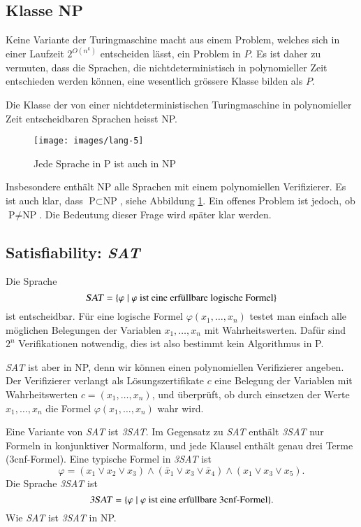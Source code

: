 \subsection{Klasse NP}
Keine Variante der Turingmaschine macht aus einem Problem,
welches sich in einer Laufzeit $2^{O(n^k)}$ entscheiden
lässt, ein Problem in $P$. Es ist daher zu vermuten,
dass die Sprachen, die nichtdeterministisch in polynomieller
Zeit entschieden werden können, eine wesentlich grössere
Klasse bilden als $P$.

\begin{definition}
Die Klasse der von einer nichtdeterministischen Turingmaschine
in polynomieller Zeit entscheidbaren Sprachen heisst NP.
\end{definition}

\begin{figure}
\begin{center}
\texttt{[image: images/lang-5]}
\end{center}
\caption{Jede Sprache in P ist auch in NP\label{psubsetnp}}
\end{figure}%

Insbesondere enthält NP alle Sprachen mit einem polynomiellen
Verifizierer. Es ist auch klar, dass $\text{P}\subset\text{NP}$,
siehe Abbildung \ref{psubsetnp}.
Ein offenes Problem ist jedoch, ob $\text{P}\ne \text{NP}$.
Die Bedeutung dieser Frage wird später klar werden.

\subsection{Satisfiability: \textsl{SAT}}
Die Sprache 
\[
\text{\textsl{SAT}}=\{\varphi\;|\;\text{$\varphi$ ist eine erfüllbare logische Formel}\}
\]
ist entscheidbar. Für eine logische Formel $\varphi(x_1,\dots,x_n)$
testet man einfach alle möglichen Belegungen der Variablen $x_1,\dots,x_n$
mit Wahrheitswerten.
Dafür sind $2^n$ Verifikationen notwendig, dies ist also
bestimmt kein Algorithmus in P.

\textsl{SAT} ist aber in NP,
denn wir können einen polynomiellen Verifizierer angeben.
Der Verifizierer verlangt als Lösungszertifikate $c$ eine
Belegung der Variablen mit Wahrheitswerten $c=(x_1,\dots,x_n)$,
und überprüft, ob durch einsetzen der Werte $x_1,\dots,x_n$
die Formel $\varphi(x_1,\dots,x_n)$ wahr wird.

Eine Variante von \textsl{SAT} ist \textsl{3SAT}.
Im Gegensatz zu \textsl{SAT} enthält \textsl{3SAT}
nur Formeln in konjunktiver Normalform, und jede Klausel
enthält genau drei Terme (3cnf-Formel).
Eine typische Formel in \textsl{3SAT} ist 
\[
\varphi=(x_1\vee x_2\vee x_3)\wedge (\bar x_1\vee x_3\vee \bar x_4)\wedge
	(x_1\vee x_3\vee x_5).
\]
Die Sprache \textsl{3SAT} ist
\[
\text{\textsl{3SAT}} =\{\varphi\;|\; \text{$\varphi$ ist eine erfüllbare 3cnf-Formel}\}.
\]
Wie \textsl{SAT} ist \textsl{3SAT} in NP.

